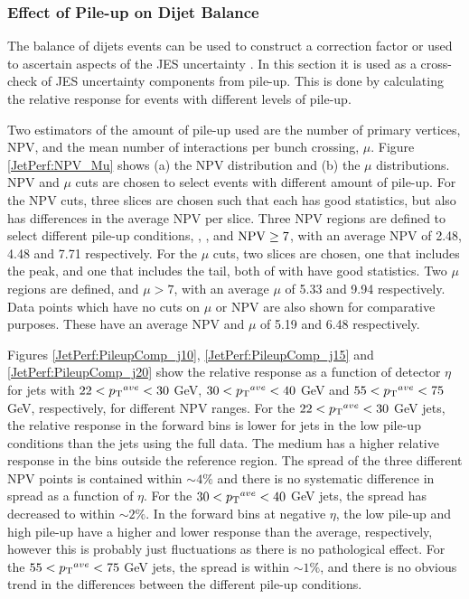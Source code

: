 \subsubsection{Effect of Pile-up on Dijet Balance}

The \pt{} balance of dijets events can be used to construct a correction factor or used to ascertain aspects of the JES uncertainty \cite{ref:JES}.
In this section it is used as a cross-check of JES uncertainty components from pile-up.
This is done by calculating the relative response for events with different levels of pile-up.

Two estimators of the amount of pile-up used are the number of primary vertices, NPV, and the mean number of interactions per bunch crossing, $\mu$.
Figure \ref{JetPerf:NPV_Mu} shows (a) the NPV distribution and (b) the $\mu$ distributions.
NPV and $\mu$ cuts are chosen to select events with different amount of pile-up.
For the NPV cuts, three slices are chosen such that each has good statistics, but also has differences in the average NPV per slice.
Three NPV regions are defined to select different pile-up conditions, , , and  $\rm NPV\ge7$, with an average NPV of 2.48, 4.48 and 7.71 respectively. 
For the $\mu$ cuts, two slices are chosen, one that includes the peak, and one that includes the tail, both of with have good statistics. 
Two $\mu$ regions are defined,  and  $\mu > 7$, with an average $\mu$ of 5.33 and 9.94 respectively. 
Data points which have no cuts on $\mu$ or NPV are also shown for comparative purposes.
These have an average NPV and $\mu$ of 5.19 and 6.48 respectively.





Figures \ref{JetPerf:PileupComp_j10}, \ref{JetPerf:PileupComp_j15} and \ref{JetPerf:PileupComp_j20}  show the relative response as a function of detector $\eta$ for jets with $22<\mbox{$\mbox{$p_{\rm T}$}{}^{ave}$}{}<30$ GeV, $30<\mbox{$\mbox{$p_{\rm T}$}{}^{ave}$}{}<40$ GeV and $55<\mbox{$\mbox{$p_{\rm T}$}{}^{ave}$}{}<75$ GeV, respectively, for different NPV ranges.
For the $22<\mbox{$\mbox{$p_{\rm T}$}{}^{ave}$}{}<30$ GeV jets, the relative response in the forward bins is lower for jets in the low pile-up conditions than the jets using the full data.
The medium has a higher relative response in the bins outside the reference region.
The spread of the three different NPV points is contained within $\sim 4\%$ and there is no systematic difference in spread as a function of $\eta{}$.
For the $30<\mbox{$\mbox{$p_{\rm T}$}{}^{ave}$}{}<40$ GeV jets, the spread has decreased to within $\sim 2\%$. 
In the forward bins at negative $\eta$, the low pile-up and high pile-up have a higher and lower response than the average, respectively, however this is probably just fluctuations as there is no pathological effect.
For the  $55<\mbox{$\mbox{$p_{\rm T}$}{}^{ave}$}{}<75$ GeV jets, the spread is within $\sim 1\%$, and there is no obvious trend in the differences between the different pile-up conditions.

